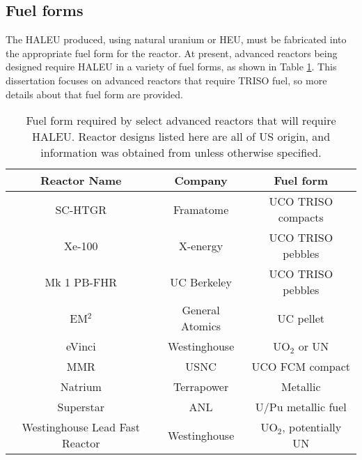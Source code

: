 \subsection{Fuel forms}
The \gls{HALEU} produced, using natural uranium or \gls{HEU}, must be 
fabricated into the appropriate fuel form for the reactor.
At present, advanced reactors being designed require \gls{HALEU} in a 
variety of fuel forms, as shown in Table \ref{tab:fuel_forms}. This 
dissertation focuses on advanced reactors that require 
\gls{TRISO} fuel, so more details about that fuel form are 
provided. 

\begin{table}[ht]
    \centering
    \caption{Fuel form required by select advanced reactors that will 
    require \gls{HALEU}. Reactor designs listed here are all of US origin, 
    and information was obtained from \cite{hussain_advances_2018} unless 
    otherwise specified.}
    \label{tab:fuel_forms}
    \begin{tabular}{c c c}
        \hline
        Reactor Name & Company & Fuel form \\\hline 
        SC-HTGR & Framatome & UCO TRISO compacts \\
        Xe-100 \cite{harlan_x-energy_2018} & X-energy & UCO TRISO pebbles \\
        Mk 1 PB-FHR & UC Berkeley & UCO TRISO pebbles\\
        EM$^2$ & General Atomics & UC pellet \\
        eVinci & Westinghouse & UO$_2$ or UN \\
        \gls{MMR} \cite{mitchell_usnc_2020} & \gls{USNC} & UCO FCM compact\\
        Natrium & Terrapower & Metallic \\
        Superstar  & \gls{ANL} & U/Pu metallic fuel \\
        Westinghouse Lead Fast Reactor  & Westinghouse & UO$_2$, potentially UN \\
        \hline        
        
    \end{tabular}
\end{table}

